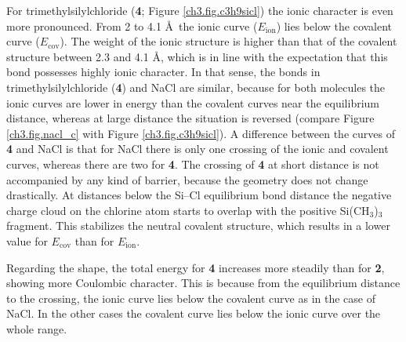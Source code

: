 For trimethylsilylchloride (\textbf{4}; Figure \ref{ch3.fig.c3h9sicl}) the ionic character is even more pronounced. From 2 to 4.1 \AA\  the ionic curve ($E_\mathrm{ion}$) lies below the covalent curve ($E_\mathrm{cov}$). The weight of the ionic structure is higher than that of the covalent structure between 2.3 and 4.1 \AA, which is in line with the expectation that this bond possesses highly ionic character. In that sense, the bonds in trimethylsilylchloride (\textbf{4}) and NaCl are similar, because for both molecules the ionic curves are lower in energy than the covalent curves near the equilibrium distance, whereas at large distance the situation is reversed (compare Figure \ref{ch3.fig.nacl_c} with Figure \ref{ch3.fig.c3h9sicl}). A difference between the curves of \textbf{4} and NaCl is that for NaCl there is only one crossing of the ionic and covalent curves, whereas there are two for \textbf{4}. The crossing of \textbf{4} at short distance is not accompanied by any kind of barrier, because the geometry does not change drastically. At distances below the Si--Cl equilibrium bond distance the negative charge cloud on the chlorine atom starts to overlap with the positive Si(CH$_3$)$_3$ fragment. This stabilizes the neutral covalent structure, which results in a lower value for $E_\mathrm{cov}$ than for $E_\mathrm{ion}$. 

Regarding the shape, the total energy for \textbf{4} increases more steadily than for \textbf{2}, showing more Coulombic character. This is because from the equilibrium distance to the crossing, the ionic curve lies below the covalent curve as in the case of NaCl. In the other cases the covalent curve lies below the ionic curve over the whole range.

